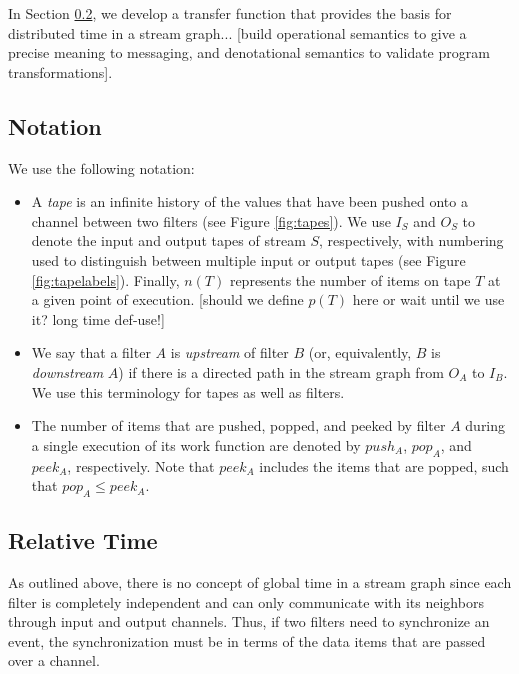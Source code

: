 In Section \ref{sec:minfunc}, we develop a transfer function that
provides the basis for distributed time in a stream graph... [build
operational semantics to give a precise meaning to messaging, and
denotational semantics to validate program transformations].

\subsection{Notation}

We use the following notation:

\begin{itemize}

\item A {\it tape} is an infinite history of the values that have been
  pushed onto a channel between two filters (see Figure
  \ref{fig:tapes}).  We use $I_S$ and $O_S$ to denote the input and
  output tapes of stream $S$, respectively, with numbering used to
  distinguish between multiple input or output tapes (see Figure
  \ref{fig:tapelabels}).  Finally, $n(T)$ represents the number of items
  on tape $T$ at a given point of execution.  [should we define $p(T)$
  here or wait until we use it?  long time def-use!]

\item We say that a filter $A$ is {\it upstream} of filter $B$ (or,
  equivalently, $B$ is {\it downstream} $A$) if there is a directed
  path in the stream graph from $O_A$ to $I_B$.  We use this
  terminology for tapes as well as filters.

\item The number of items that are pushed, popped, and peeked by
  filter $A$ during a single execution of its work function are
  denoted by $push_A$, $pop_A$, and $peek_A$, respectively.  Note that
  $peek_A$ includes the items that are popped, such that $pop_A \le
  peek_A$.

\end{itemize}

\subsection{Relative Time}
\label{sec:minfunc}

As outlined above, there is no concept of global time in a stream
graph since each filter is completely independent and can only
communicate with its neighbors through input and output channels.
Thus, if two filters need to synchronize an event, the synchronization
must be in terms of the data items that are passed over a channel.

